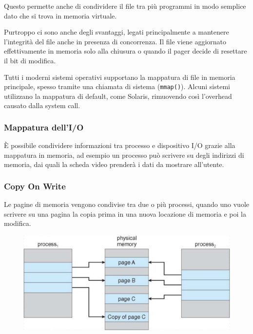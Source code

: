 \spacer
Questo permette anche di condividere il file tra più programmi in modo semplice dato che si trova in memoria virtuale.

Purtroppo ci sono anche degli svantaggi, legati principalmente a mantenere l'integrità del file anche in presenza di concorrenza.
\spacer
Il file viene aggiornato effettivamente in memoria solo alla chiusura o quando il pager decide di resettare il bit di modifica.

\spacer
Tutti i moderni sistemi operativi supportano la mappatura di file in memoria principale, spesso tramite una chiamata di sistema (\texttt{mmap()}).
Alcuni sistemi utilizzano la mappatura di default, come Solaris, rimuovendo così l'overhead causato dalla system call.

\subsubsection{Mappatura dell'I/O}
È possibile condividere informazioni tra processo e dispositivo I/O grazie alla mappatura in memoria, ad esempio un processo può scrivere su degli indirizzi di memoria, dai quali la scheda video prenderà i dati da mostrare all'utente.

\subsubsection{Copy On Write}
Le pagine di memoria vengono condivise tra due o più processi, quando uno vuole scrivere su una pagina la copia prima in una nuova locazione di memoria e poi la modifica.

\begin{figure}[H]
    \centering
    \includegraphics[width=0.5\linewidth]{assets/copy-on-write.jpeg}
\end{figure}
